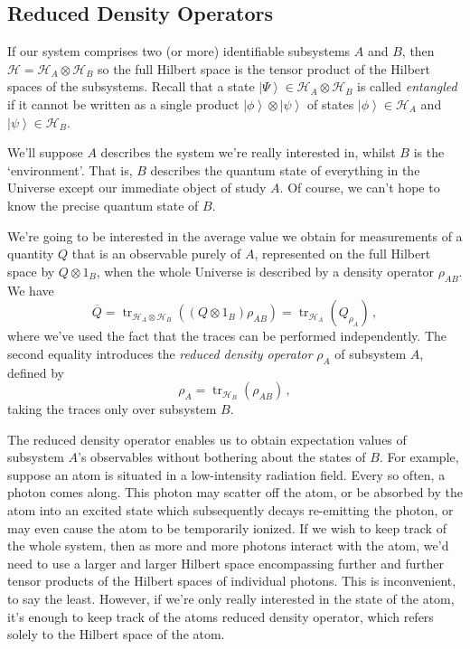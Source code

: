 \documentclass{article}
\theoremstyle{plain}\theoremheaderfont{\normalfont\itshape}\theorembodyfont{\rmfamily}\theoremseparator{.}\newtheorem*{rem}{Remark}\newtheorem*{ex}{Example}\newtheorem*{proof}{Proof}\newtheorem*{altp}{Alternative proof}
\theoremstyle{plain}\theoremheaderfont{\normalfont\bfseries}\theorembodyfont{\rmfamily}\theoremseparator{.}\newtheorem{thm}{Theorem}[section]\newtheorem{lem}[thm]{Lemma}\newtheorem{prop}[thm]{Proposition}\newtheorem*{cor}{Corollary}\newtheorem{defn}[thm]{Definition}\newtheorem{clm}[thm]{Claim}\newtheorem{clminproof}{Claim}
\theoremstyle{break}\theoremheaderfont{\normalfont\itshape}\theorembodyfont{\rmfamily}\theoremseparator{.\medskip}\newtheorem*{proofskip}{Proof}\newtheorem*{exs}{Examples}\newtheorem*{rems}{Remarks}
\theoremstyle{break}\theoremheaderfont{\normalfont\bfseries}\theorembodyfont{\rmfamily}\theoremseparator{.\medskip}\newtheorem{lemskip}[thm]{Lemma}\newtheorem{defnskip}[thm]{Definition}\newtheorem{propskip}[thm]{Proposition}\newtheorem{thmskip}[thm]{Theorem}
\numberwithin{equation}{section}
\newcommand{\ket}[1]{\left| #1 \right\rangle}
\newcommand{\hb}{\mathcal{H}}
\DeclareMathOperator{\tr}{tr}
\begin{document}
    \subsection{Reduced Density Operators}
    If our system comprises two (or more) identifiable subsystems \(A\) and \(B\), then \(\hb=\hb_A\otimes\hb_B\) so the full Hilbert space is the tensor product of the Hilbert spaces of the subsystems. Recall that a state \(\ket{\Psi}\in\hb_A\otimes\hb_B\) is called \textit{entangled} if it cannot be written as a single product \(\ket{\phi}\otimes\ket{\psi}\) of states \(\ket{\phi}\in\hb_A\) and \(\ket{\psi}\in\hb_B\).

    We'll suppose \(A\) describes the system we're really interested in, whilst \(B\) is the `environment'. That is, \(B\) describes the quantum state of everything in the Universe except our immediate object of study \(A\). Of course, we can't hope to know the precise quantum state of \(B\).

    We're going to be interested in the average value we obtain for measurements of a quantity \(Q\) that is an observable purely of \(A\), represented on the full Hilbert space by \(Q\otimes 1_B\), when the whole Universe is described by a density operator \(\rho_{AB}\). We have
    \begin{equation}
        \overline{Q}=\tr_{\hb_A\otimes\hb_B}((Q\otimes 1_B)\rho_{AB})=\tr_{\hb_A}(Q_{\rho_A})\,,
    \end{equation}
    where we've used the fact that the traces can be performed independently. The second equality introduces the \textit{reduced density operator} \(\rho_A\) of subsystem \(A\), defined by
    \begin{equation}
        \rho_A=\tr_{\hb_B}(\rho_{AB})\,,
    \end{equation}
    taking the traces only over subsystem \(B\).

    The reduced density operator enables us to obtain expectation values of subsystem \(A\)'s observables without bothering about the states of \(B\). For example, suppose an atom is situated in a low-intensity radiation field. Every so often, a photon comes along. This photon may scatter off the atom, or be absorbed by the atom into an excited state which subsequently decays re-emitting the photon, or may even cause the atom to be temporarily ionized. If we wish to keep track of the whole system, then as more and more photons interact with the atom, we'd need to use a larger and larger Hilbert space encompassing further and further tensor products of the Hilbert spaces of individual photons. This is inconvenient, to say the least. However, if we're only really interested in the state of the atom, it's enough to keep track of the atoms reduced density operator, which refers solely to the Hilbert space of the atom.
\end{document}
